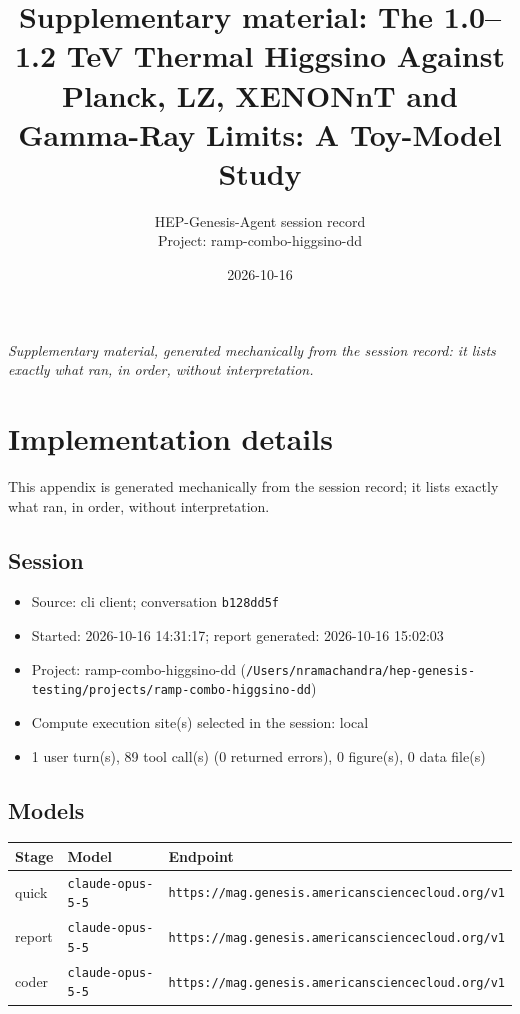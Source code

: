 \documentclass[11pt,a4paper]{article}
\title{Supplementary material: The 1.0--1.2 TeV Thermal Higgsino Against Planck, LZ, XENONnT and Gamma-Ray Limits: A Toy-Model Study}
\author{HEP-Genesis-Agent session record \\ \small Project: ramp-combo-higgsino-dd}
\date{2026-10-16}
\begin{document}
\maketitle
\noindent\textit{\small Supplementary material, generated mechanically from the session record: it lists exactly what ran, in order, without interpretation.}
\vspace{1em}



\appendix
\section{Implementation details}
\label{app:impl}
This appendix is generated mechanically from the session record; it lists exactly what ran, in order, without interpretation.
\subsection{Session}
\begin{itemize}
  \item Source: cli client; conversation \texttt{b128dd5f}
  \item Started: 2026-10-16 14:31:17; report generated: 2026-10-16 15:02:03
  \item Project: ramp-combo-higgsino-dd (\texttt{/\allowbreak{}Users/\allowbreak{}nramachandra/\allowbreak{}hep-genesis-testing/\allowbreak{}projects/\allowbreak{}ramp-combo-higgsino-dd})
  \item Compute execution site(s) selected in the session: local
  \item 1 user turn(s), 89 tool call(s) (0 returned errors), 0 figure(s), 0 data file(s)
\end{itemize}
\subsection{Models}
\begin{longtable}{@{}p{}p{}p{}@{}}
\toprule Stage & Model & Endpoint \\ \midrule \endhead
quick & \texttt{claude-opus-5-5} & \texttt{https:\allowbreak{}/\allowbreak{}/\allowbreak{}mag.genesis.americansciencecloud.org/\allowbreak{}v1} \\
report & \texttt{claude-opus-5-5} & \texttt{https:\allowbreak{}/\allowbreak{}/\allowbreak{}mag.genesis.americansciencecloud.org/\allowbreak{}v1} \\
coder & \texttt{claude-opus-5-5} & \texttt{https:\allowbreak{}/\allowbreak{}/\allowbreak{}mag.genesis.americansciencecloud.org/\allowbreak{}v1} \\
\bottomrule\end{longtable}
\end{document}
